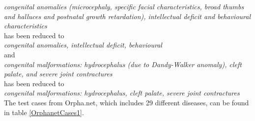 {\small
\textit{congenital anomalies (microcephaly, specific facial characteristics, broad thumbs and halluces and postnatal growth retardation), intellectual deficit and behavioural characteristics}
}\\

has been reduced to\\

{\small
\textit{congenital anomalies, intellectual deficit, behavioural}
}\\

and\\

{\small
\textit{congenital malformations: hydrocephalus (due to Dandy-Walker anomaly), cleft palate, and severe joint contractures}
}\\



has been reduced to \\

{\small
\textit{congenital malformations: hydrocephalus, cleft palate, severe joint contractures}
}\\

The test cases from Orpha.net, which includes 29 different diseases, can be
found in table \ref{OrphanetCases1}.



